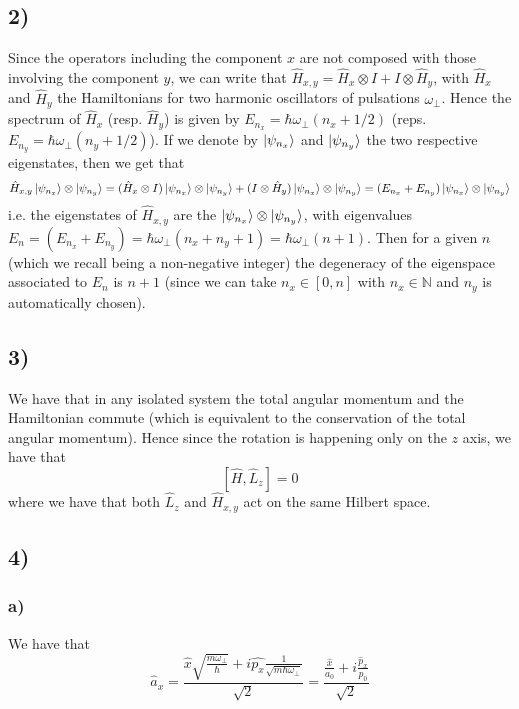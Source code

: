 \documentclass[10pt,a4paper]{book}
\begin{document}
\subsection*{2)}
Since the operators including the component $x$ are not composed with those involving the component $y$, we can write that $\hat{H}_{x,y}=\hat{H}_x\otimes I+I\otimes\hat{H}_y$, with $\hat{H}_x$ and $\hat{H}_y$ the Hamiltonians for two harmonic oscillators of pulsations $\omega_{\perp}$. Hence the spectrum of $\hat{H}_x$ (resp. $\hat{H}_y$) is given by $E_{n_x}=\hbar \omega_{\perp}(n_x+1/2)$ (reps. $E_{n_y}=\hbar\omega_{\perp}(n_y+1/2)$). If we denote by $\ket{\psi_{n_x}}$ and $\ket{\psi_{n_y}}$ the two respective eigenstates, then we get that
$$\hat{H}_{x,y}\ket{\psi_{n_x}}\otimes\ket{\psi_{n_y}}=(\hat{H}_x\otimes I)\ket{\psi_{n_x}}\otimes\ket{\psi_{n_y}}+(I\otimes\hat{H}_y)\ket{\psi_{n_x}}\otimes\ket{\psi_{n_y}}=(E_{n_x}+E_{n_y})\ket{\psi_{n_x}}\otimes\ket{\psi_{n_y}}$$
i.e. the eigenstates of $\hat{H}_{x,y}$ are the $\ket{\psi_{n_x}}\otimes\ket{\psi_{n_y}}$, with eigenvalues $E_n=(E_{n_x}+E_{n_y})=\hbar\omega_{\perp}(n_x+n_y+1)=\hbar\omega_{\perp}(n+1)$. Then for a given $n$ (which we recall being a non-negative integer) the degeneracy of the eigenspace associated to $E_n$ is $n+1$ (since we can take $n_x\in [0,n]$ with $n_x\in\mathbb{N}$ and $n_y$ is automatically chosen).

\subsection*{3)}

We have that in any isolated system the total angular momentum and the Hamiltonian commute (which is equivalent to the conservation of the total angular momentum). Hence since the rotation is happening only on the $z$ axis, we have that $$[\hat{H},\hat{L}_z]=0$$
where we have that both $\hat{L}_z$ and $\hat{H}_{x,y}$ act on the same Hilbert space.


\subsection*{4)}

\subsubsection*{a)}

We have that 
$$\hat{a}_x=\frac{\hat{x}\sqrt{\frac{m\omega_{\perp}}{\hbar}}+i\hat{p_x}\frac{1}{\sqrt{m\hbar\omega_{\perp}}}}{\sqrt{2}}=\frac{\frac{\hat{x}}{a_0}+i\frac{\hat{p}_x}{p_0}}{\sqrt{2}}$$
\end{document}
